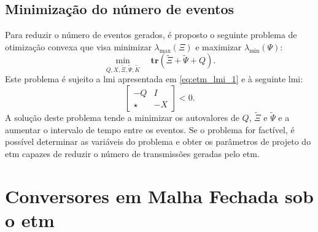 \subsection{Minimização do número de eventos}


Para reduzir o número de eventos gerados, é proposto o seguinte problema de otimização convexa que visa minimizar $\lambda_{\max} (\Xi)$ e maximizar $\lambda_{\min}(\Psi)$: \begin{equation}\underset{Q, X, \tilde{\Xi}, \tilde{\Psi}, \tilde{K}}\min \quad \mathbf{tr}(\tilde{\Xi} + \tilde{\Psi} + Q). \label{eq:optimization_problem}\end{equation} Este problema é sujeito a \acrshort{lmi} apresentada em \eqref{eq:etm_lmi_1} e à seguinte \acrshort{lmi}: \begin{equation}\begin{bmatrix}
  -Q & I \\ \star & -X
\end{bmatrix} < 0. \label{eq:constraints_2}\end{equation} A solução deste problema tende a minimizar os autovalores de $Q$, $\tilde{\Xi}$ e $\tilde{\Psi}$ e a aumentar o intervalo de tempo entre os eventos. Se o problema for factível, é possível determinar as variáveis do problema e obter os parâmetros de projeto do \acrshort{etm} capazes de reduzir o número de transmissões geradas pelo \acrshort{etm}.

\section{Conversores em Malha Fechada sob o \acrshort{etm}}